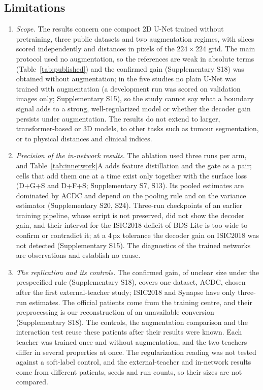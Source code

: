 \documentclass[fleqn,10pt,lineno]{wlpeerj}
\begin{document}
\subsection*{Limitations}
\begin{enumerate}\setlength{\itemsep}{0pt}
\item \emph{Scope.} The results concern one compact 2D U-Net trained without pretraining, three public datasets and two augmentation regimes, with slices scored independently and distances in pixels of the $224\times224$ grid. The main protocol used no augmentation, so the references are weak in absolute terms (Table~\ref{tab:published}) and the confirmed gain (Supplementary S18) was obtained without augmentation; in the five studies no plain U-Net was trained with augmentation (a development run was scored on validation images only; Supplementary S15), so the study cannot say what a boundary signal adds to a strong, well-regularized model or whether the decoder gain persists under augmentation. The results do not extend to larger, transformer-based or 3D models, to other tasks such as tumour segmentation, or to physical distances and clinical indices.
\item \emph{Precision of the in-network results.} The ablation used three runs per arm, and Table~\ref{tab:innetwork}A adds feature distillation and the gate as a pair; cells that add them one at a time exist only together with the surface loss (D+G+S and D+F+S; Supplementary S7, S13). Its pooled estimates are dominated by ACDC and depend on the pooling rule and on the variance estimator (Supplementary S20, S24). Three-run checkpoints of an earlier training pipeline, whose script is not preserved, did not show the decoder gain, and their interval for the ISIC2018 deficit of BDS-Lite is too wide to confirm or contradict it; at a 4\,px tolerance the decoder gain on ISIC2018 was not detected (Supplementary S15). The diagnostics of the trained networks are observations and establish no cause.
\item \emph{The replication and its controls.} The confirmed gain, of unclear size under the prespecified rule (Supplementary S18), covers one dataset, ACDC, chosen after the first external-teacher study; ISIC2018 and Synapse have only three-run estimates. The official patients come from the training centre, and their preprocessing is our reconstruction of an unavailable conversion (Supplementary S18). The controls, the augmentation comparison and the interaction test reuse these patients after their results were known. Each teacher was trained once and without augmentation, and the two teachers differ in several properties at once. The regularization reading was not tested against a soft-label control, and the external-teacher and in-network results come from different patients, seeds and run counts, so their sizes are not compared.
\end{enumerate}
\end{document}
